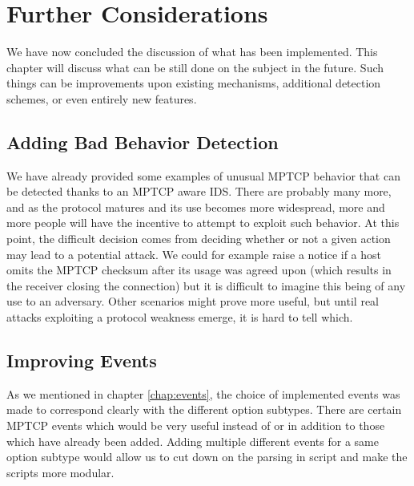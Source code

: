 


\chapter{Further Considerations} \label{chap:further}
We have now concluded the discussion of what has been implemented. This chapter will discuss what can be still done on the subject in the future. Such things can be improvements upon existing mechanisms, additional detection schemes, or even entirely new features.

\section{Adding Bad Behavior Detection}
We have already provided some examples of unusual MPTCP behavior that can be detected thanks to an MPTCP aware IDS. There are probably many more, and as the protocol matures and its use becomes more widespread, more and more people will have the incentive to attempt to exploit such behavior. At this point, the difficult decision comes from deciding whether or not a given action may lead to a potential attack. We could for example raise a notice if a host omits the MPTCP checksum after its usage was agreed upon (which results in the receiver closing the connection) but it is difficult to imagine this being of any use to an adversary. Other scenarios might prove more useful, but until real attacks exploiting a protocol weakness emerge, it is hard to tell which.

\section{Improving Events} 
As we mentioned in chapter \ref{chap:events}, the choice of implemented events was made to correspond clearly with the different option subtypes. There are certain MPTCP events which would be very useful instead of or in addition to those which have already been added. Adding multiple different events for a same option subtype would allow us to cut down on the parsing in script and make the scripts more modular. \\

